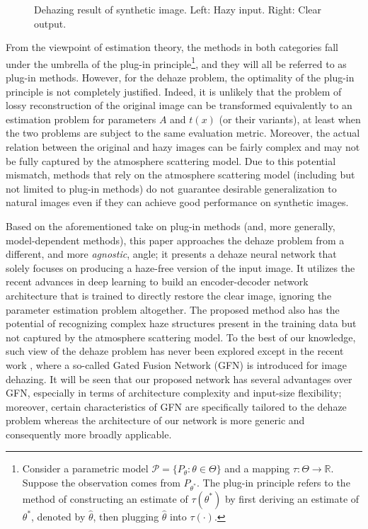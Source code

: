 \documentclass[journal]{IEEEtran}
\begin{document}
\begin{figure}
	\subfigure{
		\texttt{[image: 1]}}
	\hspace{0in}
	\captionsetup{justification=centering}
	\centering\caption{Dehazing result of synthetic image. Left: Hazy input. Right: Clear output.}
\end{figure}

From the  viewpoint of estimation theory, the methods in both categories fall under the umbrella of the plug-in principle\footnote{Consider a parametric model $\mathcal{P}=\{P_{\theta}:\theta\in\Theta\}$ and a mapping $\tau:\Theta\rightarrow\mathbb{R}$. Suppose the observation comes from $P_{\theta^*}$. The plug-in principle refers to the method of constructing an estimate of $\tau(\theta^*)$ by first deriving an estimate of $\theta^*$, denoted by $\hat{\theta}$, then plugging $\hat{\theta}$ into $\tau(\cdot)$.}, and they will all be referred to as plug-in methods. 
However, for the dehaze problem, the optimality of the plug-in principle is not completely justified. Indeed, it is unlikely that the problem of lossy reconstruction of the original image can be transformed equivalently to an estimation problem for  parameters $A$ and $t(x)$ (or their variants), at least when the two problems are subject to the same evaluation metric. Moreover, the actual relation between the original and hazy images  can be fairly complex and may not be fully captured by the atmosphere scattering model. Due to this potential mismatch, methods that rely on the atmosphere scattering model (including but not limited to plug-in methods) do not guarantee desirable generalization to natural images even if they can achieve good performance on synthetic images.








Based on the aforementioned take on plug-in methods (and, more generally, model-dependent methods), this paper approaches the dehaze problem from a different, and more \textit{agnostic}, angle; it presents a dehaze neural network that solely focuses on producing a haze-free version of the input image. It utilizes the recent advances in deep learning to build an encoder-decoder network architecture that is  trained to directly restore the clear image, ignoring the parameter estimation problem altogether. The proposed method also has the potential of recognizing complex haze structures present in the training data but not captured by the atmosphere scattering model. To the best of our knowledge, such view of the dehaze problem has never been explored except in the recent work  \cite{GFN}, where a so-called Gated Fusion Network (GFN) is introduced for image dehazing. It will be seen that our proposed network has several advantages over GFN, especially in terms of architecture complexity and input-size flexibility; moreover, certain characteristics of GFN are specifically tailored to the dehaze problem whereas the architecture of our network is more generic and consequently more broadly applicable. 
\end{document}
